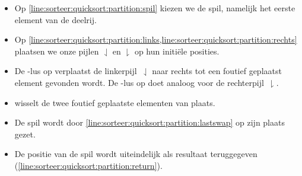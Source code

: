 {
\newcommand{\LEFT}{\ensuremath{\downharpoonleft}}
\newcommand{\RIGHT}{\ensuremath{\downharpoonright}}
\begin{itemize}
  \item Op \cref{line:sorteer:quicksort:partition:spil} kiezen we de spil, namelijk
        het eerste element van de deelrij.
  \item Op \cref{line:sorteer:quicksort:partition:links,line:sorteer:quicksort:partition:rechts}
        plaatsen we onze pijlen $\LEFT$ en $\RIGHT$ op hun initi\"ele posities.
  \item De -lus op
        verplaatst de linkerpijl~$\LEFT$ naar rechts tot een foutief geplaatst element
        gevonden wordt. De -lus op
        doet analoog voor de rechterpijl~$\RIGHT$.
  \item {} wisselt de twee foutief geplaatste elementen
        van plaats.
  \item De spil wordt door \cref{line:sorteer:quicksort:partition:lastswap} op zijn plaats gezet.
  \item De positie van de spil wordt uiteindelijk als
        resultaat teruggegeven (\cref{line:sorteer:quicksort:partition:return}).
\end{itemize}
}


